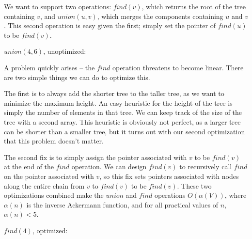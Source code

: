 \documentclass[11pt]{book}
\begin{document}
We want to support two operations: $find(v)$, which returns the root of the tree containing $v$, and $union(u,v)$, which merges the components containing $u$ and $v$. This second operation is easy given the first; simply set the pointer of $find(u)$ to be $find(v)$.

$union(4, 6)$, unoptimized:

\begin{center}
\end{center}

A problem quickly arises -- the $find$ operation threatens to become linear. There are two simple things we can do to optimize this.

The first is to always add the shorter tree to the taller tree, as we want to minimize the maximum height. An easy heuristic for the height of the tree is simply the number of elements in that tree. We can keep track of the size of the tree with a second array. This heuristic is obviously not perfect, as a larger tree can be shorter than a smaller tree, but it turns out with our second optimization that this problem doesn't matter.

The second fix is to simply assign the pointer associated with $v$ to be $find(v)$ at the end of the $find$ operation. We can design $find(v)$ to recursively call $find$ on the pointer associated with $v$, so this fix sets pointers associated with nodes along the entire chain from $v$ to $find(v)$ to be $find(v)$. These two optimizations combined make the $union$ and $find$ operations $O(\alpha (V))$, where $\alpha(n)$ is the inverse Ackermann function, and for all practical values of $n$, $\alpha(n) < 5$.

$find(4)$, optimized:

\begin{center}
\end{center}
\end{document}
